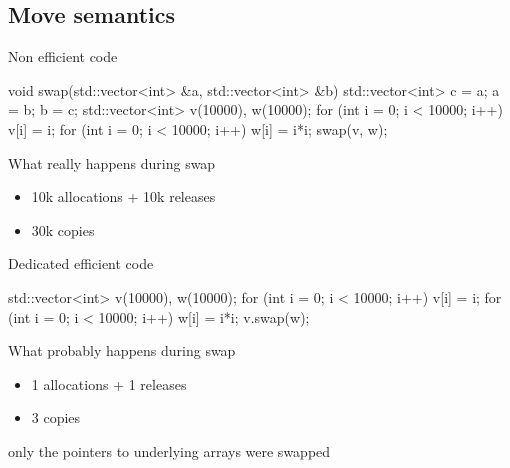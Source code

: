 \subsection[mv]{Move semantics}

\begin{frame}[fragile]
  \begin{exampleblock}{Non efficient code}
    \begin{cppcode*}{}
      void swap(std::vector<int> &a,
                std::vector<int> &b) {
        std::vector<int> c = a;
        a = b;
        b = c;
      }
      std::vector<int> v(10000), w(10000);
      for (int i = 0; i < 10000; i++) v[i] = i;
      for (int i = 0; i < 10000; i++) w[i] = i*i;
      swap(v, w);
    \end{cppcode*}
  \end{exampleblock}
  \pause
  \begin{alertblock}{What really happens during swap}
    \begin{itemize}
    \item 10k allocations + 10k releases
    \item 30k copies
    \end{itemize}
  \end{alertblock}
\end{frame}

\begin{frame}[fragile]
  \begin{exampleblock}{Dedicated efficient code}
    \begin{cppcode*}{}
      std::vector<int> v(10000), w(10000);
      for (int i = 0; i < 10000; i++) v[i] = i;
      for (int i = 0; i < 10000; i++) w[i] = i*i;
      v.swap(w);
      \end{cppcode*}
  \end{exampleblock}
  \pause
  \begin{block}{What probably happens during swap}
    \begin{itemize}
    \item 1 allocations + 1 releases
    \item 3 copies
    \end{itemize}
    only the pointers to underlying arrays were swapped
  \end{block}
\end{frame}

